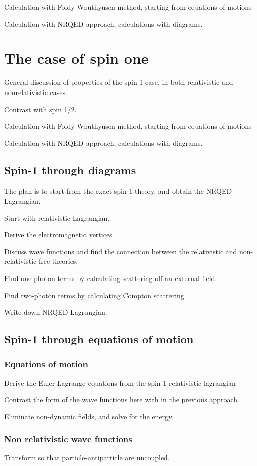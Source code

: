 \documentclass[12pt]{article}
\begin{document}
Calculation with Foldy-Wouthyusen method, starting from equations of motions

Calculation with NRQED approach, calculations with diagrams.

\section{The case of spin one}
General discussion of properties of the spin 1 case, in both relativistic and nonrelativistic cases.

Contrast with spin 1/2.

Calculation with Foldy-Wouthyusen method, starting from equations of motions


Calculation with NRQED approach, calculations with diagrams.


\subsection{Spin-1 through diagrams}
The plan is to start from the exact spin-1 theory, and obtain the NRQED Lagrangian.

Start with relativistic Lagrangian.

Derive the electromagnetic vertices.

Discuss wave functions and find the connection between the relativistic and non-relativistic free theories.

Find one-photon terms by calculating scattering off an external field.

Find two-photon terms by calculating Compton scattering.

Write down NRQED Lagrangian.

\subsection{Spin-1 through equations of motion}

\subsubsection{Equations of motion}
Derive the Euler-Lagrange equations from the spin-1 relativistic lagrangian

Contrast the form of the wave functions here with in the previous approach.

Eliminate non-dynamic fields, and solve for the energy.


\subsubsection{Non relativistic wave functions}
Transform so that particle-antiparticle are uncoupled.
\end{document}

